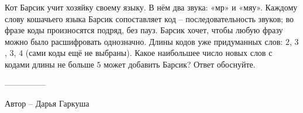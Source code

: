 \question
Кот Барсик учит хозяйку своему языку. В нём два звука: «мр» и «мяу». Каждому слову кошачьего языка Барсик сопоставляет код -- последовательность звуков; во фразе коды произносятся подряд, без пауз. Барсик хочет, чтобы любую фразу можно было расшифровать однозначно. Длины кодов уже придуманных слов: $2$, $3$, $3$, $4$ (сами коды ещё не выбраны). Какое наибольшее число новых слов с кодами длины не больше $5$ может добавить Барсик? Ответ обоснуйте.

---------------

Автор -- Дарья Гаркуша